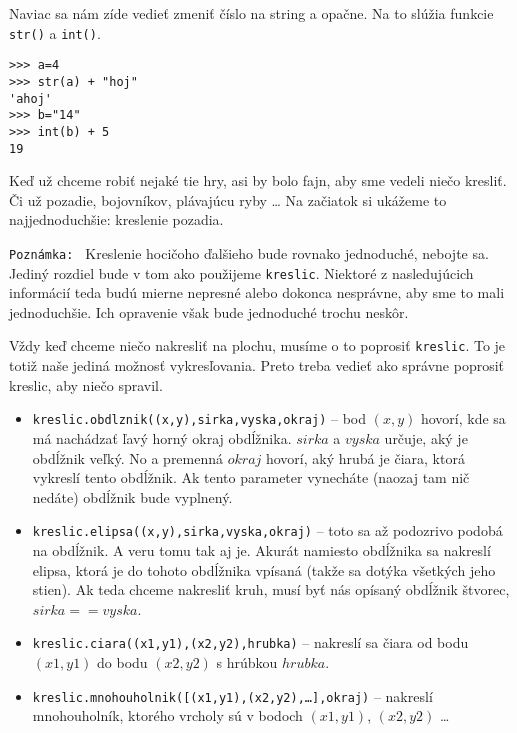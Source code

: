 Naviac sa nám zíde vedieť zmeniť číslo na string a opačne. Na to slúžia funkcie \texttt{str()} a \texttt{int()}.

\begin{lstlisting}
>>> a=4
>>> str(a) + "hoj"
'ahoj'
>>> b="14"
>>> int(b) + 5
19
\end{lstlisting}


Keď už chceme robiť nejaké tie hry, asi by bolo fajn, aby sme vedeli niečo kresliť. Či už pozadie, bojovníkov, plávajúcu ryby \dots
Na začiatok si ukážeme to najjednoduchšie: kreslenie pozadia.

\texttt{Poznámka: } Kreslenie hocičoho ďalšieho bude rovnako jednoduché, nebojte sa. Jediný rozdiel bude v tom ako použijeme \texttt{kreslic}.
Niektoré z nasledujúcich informácií teda budú mierne nepresné alebo dokonca nesprávne, aby sme to mali jednoduchšie. Ich opravenie však bude
jednoduché trochu neskôr.


Vždy keď chceme niečo nakresliť na plochu, musíme o to poprosiť \texttt{kreslic}. To je totiž naše jediná možnosť vykresľovania. Preto treba vedieť
ako správne poprosiť kreslic, aby niečo spravil.

\begin{itemize}
	\item \texttt{kreslic.obdlznik((x,y),sirka,vyska,okraj)} -- bod $(x,y)$ hovorí, kde sa má nachádzať ľavý horný okraj obdĺžnika. $sirka$ a $vyska$
		určuje, aký je obdĺžnik veľký. No a premenná $okraj$ hovorí, aký hrubá je čiara, ktorá vykreslí tento obdĺžnik. Ak tento parameter
		vynecháte (naozaj tam nič nedáte) obdĺžnik bude vyplnený.
	\item \texttt{kreslic.elipsa((x,y),sirka,vyska,okraj)} -- toto sa až podozrivo podobá na obdĺžnik. A veru tomu tak aj je. Akurát namiesto obdĺžnika
		sa nakreslí elipsa, ktorá je do tohoto obdĺžnika vpísaná (takže sa dotýka všetkých jeho stien). Ak teda chceme nakresliť kruh, musí
		byť nás opísaný obdĺžnik štvorec, $sirka == vyska$.
	\item \texttt{kreslic.ciara((x1,y1),(x2,y2),hrubka)} -- nakreslí sa čiara od bodu $(x1,y1)$ do bodu $(x2,y2)$ s hrúbkou $hrubka$.
	\item \texttt{kreslic.mnohouholnik([(x1,y1),(x2,y2),\dots],okraj)} -- nakreslí mnohouholník, ktorého vrcholy sú v bodoch $(x1,y1)$, $(x2,y2)$ \dots
\end{itemize}


